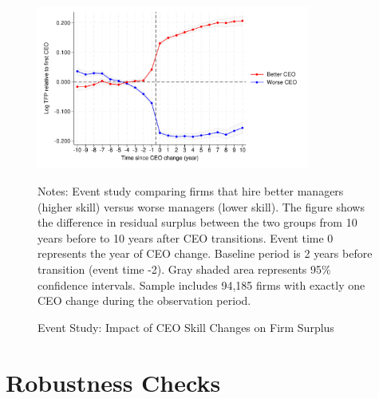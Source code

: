 \documentclass[11pt,a4paper]{article}
\begin{document}
\begin{figure}[htbp]
\centering
\includegraphics[width=0.8\textwidth]{figure/event_study.pdf}
\caption{Event Study: Impact of CEO Skill Changes on Firm Surplus}
\label{fig:event_study}
\footnotesize
Notes: Event study comparing firms that hire better managers (higher skill) versus worse managers (lower skill). The figure shows the difference in residual surplus between the two groups from 10 years before to 10 years after CEO transitions. Event time 0 represents the year of CEO change. Baseline period is 2 years before transition (event time -2). Gray shaded area represents 95\% confidence intervals. Sample includes 94,185 firms with exactly one CEO change during the observation period.
\end{figure}






\appendix
\section{Robustness Checks}




\end{document}
